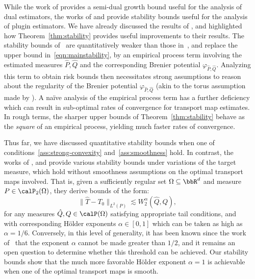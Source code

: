 While the work of \citet{hutter2021} provides a semi-dual growth bound useful for the analysis of dual estimators, the works of \citet{ghosal2022,deb2021} and \citet{manole2024plugin} provide stability bounds useful for the analysis of plugin estimators. We have already discussed the results of \citet{manole2024plugin}, and highlighted how Theorem~\ref{thm:stability} provides useful improvements to their results. The stability bounds of~\citet{ghosal2022,deb2021} are quantitatively weaker than those in~\citet{manole2024plugin}, and replace the upper bound in~\eqref{eqn:mainstability}, by an empirical process term involving the estimated measures $\widehat{P}, \widehat{Q}$ and the corresponding Brenier potential $\varphi_{\widehat{P},\widehat{Q}}$. Analyzing this term to obtain risk bounds then necessitates strong assumptions to reason about the regularity of the Brenier potential $\varphi_{\widehat{P},\widehat{Q}}$ (akin to the torus assumption made by \citet{manole2024plugin}). 
A na\"{i}ve analysis of the empirical process term has a further deficiency which can result in sub-optimal rates of convergence for transport map estimates. In rough terms, the sharper upper bounds of Theorem~\ref{thm:stability} behave as the \emph{square} of an empirical process, yielding much faster rates of convergence.

Thus far, we have discussed
quantitative stability bounds
when one of conditions~\ref{ass:strong-convexity}
and~\ref{ass:smoothness} hold. 
In contrast, the works of \citet{berman2021convergence,merigot2020,delalande2023,gallouet2022strong}, and \citet{letrouit2024}  provide various stability bounds under variations of the target measure, which hold without smoothness assumptions on the optimal transport maps involved. That is, 
given a sufficiently regular
set $\Omega \subseteq \bbR^d$
and measure $P \in \calP_2(\Omega)$,
they derive bounds of the form:
\begin{equation}
\label{eq:merigot}
\|\hat T - T_0\|_{L^2(P)} \lesssim  W_2^\alpha(\hat Q,Q),
\end{equation}
for any measures $\hat Q,Q \in \calP(\Omega)$
satisfying appropriate tail conditions,
and with corresponding H\"older exponents $\alpha\in[0,1]$
which can be taken as high as $\alpha=1/6$.
Conversely, in this level
of generality, it
has been known since the work
of~\cite{gigli2011}
that the exponent $\alpha$ cannot be made greater than $1/2$, 
and it remains an open question to determine
whether this threshold can be achieved.
Our stability bounds show that 
the much more favorable H\"older exponent $\alpha=1$
is achievable when one of the optimal
transport maps is smooth. 

